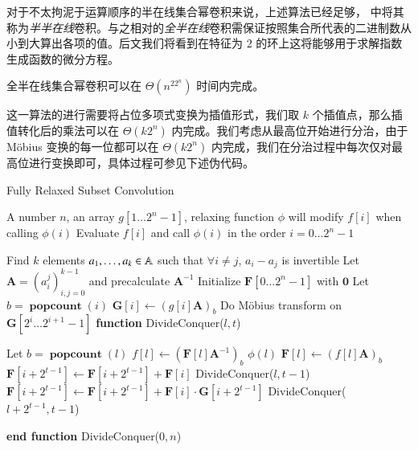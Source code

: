 对于不太拘泥于运算顺序的半在线集合幂卷积来说，上述算法已经足够，\cite{nimberpoly} 中将其称为\emph{半半在线}卷积。与之相对的\emph{全半在线}卷积需保证按照集合所代表的二进制数从小到大算出各项的值。后文我们将看到在特征为 $2$ 的环上这将能够用于求解指数生成函数的微分方程。

\begin{theorem}
全半在线集合幂卷积可以在 $\Theta(n^22^n)$ 时间内完成。
\end{theorem}

这一算法的进行需要将占位多项式变换为插值形式，我们取 $k$ 个插值点，那么插值转化后的乘法可以在 $\Theta(k2^n)$ 内完成。我们考虑从最高位开始进行分治，由于 M\"obius 变换的每一位都可以在 $\Theta(k2^n)$ 内完成，我们在分治过程中每次仅对最高位进行变换即可，具体过程可参见下述伪代码。

\begin{breakablealgorithm}
  \caption{Fully Relaxed Subset Convolution}
  \begin{algorithmic}[1]
    \REQUIRE A number $n$, an array $g[1\dots 2^n-1]$, relaxing function $\phi$ will modify $f[i]$ when calling $\phi(i)$
    \ENSURE Evaluate $f[i]$ and call $\phi(i)$ in the order $i=0\dots 2^n-1$
   
    \STATE Find $k$ elements $a_1,\dots,a_k\in \mathbb A$ such that $\forall i\neq j$, $a_i-a_j$ is invertible
    \STATE Let $\mathbf A = (a_i^j)_{i,j=0}^{k-1}$ and precalculate $\mathbf A^{-1}$
    \STATE Initialize $\mathbf F[0\dots 2^n-1]$ with $\mathbf 0$
      \STATE Let $b = \operatorname{\mathbf{popcount}}(i)$
      \STATE $\mathbf G[i] \leftarrow (g[i] \mathbf A)_b$
    \ENDFOR
      \STATE Do M\"obius transform on $\mathbf G[2^i\dots 2^{i+1}-1]$
    \ENDFOR
    \STATE \textbf{function} DivideConquer($l, t$) \COMMENT {solve $[l, l+2^t)$}
    \begin{ALC@g} %
      \STATE Let $b = \operatorname{\mathbf{popcount}}(l)$
      \STATE $f[l] \leftarrow (\mathbf F[l] \mathbf A^{-1})_b$ 
      \STATE $\phi(l)$
      \STATE $\mathbf F[l] \leftarrow (f[l] \mathbf A)_b$
    \ELSE
        \STATE $\mathbf F[i + 2^{t-1}] \leftarrow \mathbf F[i + 2^{t-1}] + \mathbf F[i]$
      \ENDFOR
      \STATE DivideConquer($l, t-1$)
        \STATE $\mathbf F[i + 2^{t-1}] \leftarrow \mathbf F[i + 2^{t-1}] + \mathbf F[i] \cdot \mathbf G[i + 2^{t-1}]$
      \ENDFOR
      \STATE DivideConquer($l+2^{t-1}, t-1$)
    \ENDIF
    \end{ALC@g}
    \STATE \textbf{end function}
    \STATE DivideConquer($0, n$)
  \end{algorithmic}
\end{breakablealgorithm}


